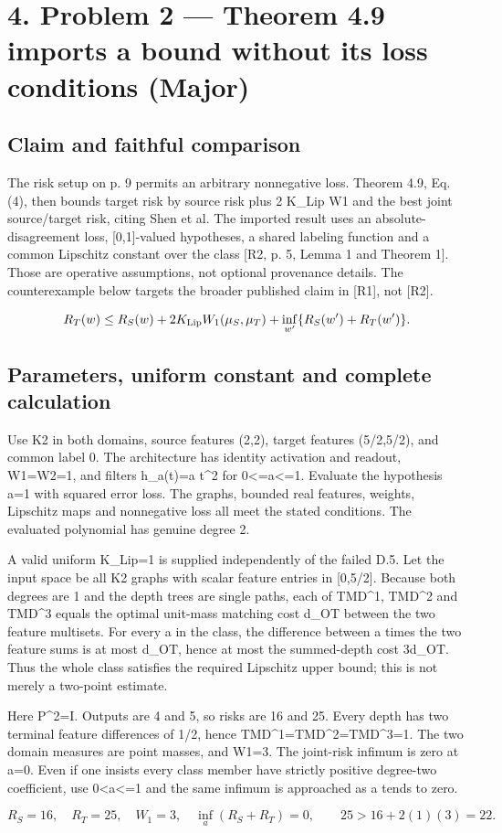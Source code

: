 \documentclass[10pt]{article}
\begin{document}
\section*{4. Problem 2 — Theorem 4.9 imports a bound without its loss conditions (Major)}
\subsection*{Claim and faithful comparison}
The risk setup on p. 9 permits an arbitrary nonnegative loss. Theorem 4.9, Eq. (4), then bounds target risk by source risk plus 2 K\_Lip W1 and the best joint source/target risk, citing Shen et al. The imported result uses an absolute-disagreement loss, [0,1]-valued hypotheses, a shared labeling function and a common Lipschitz constant over the class [R2, p. 5, Lemma 1 and Theorem 1]. Those are operative assumptions, not optional provenance details. The counterexample below targets the broader published claim in [R1], not [R2].\par
\[R_T(w)\le R_S(w)+2K_{\rm Lip}W_1(\mu_S,\mu_T)+\inf_{w'}\{R_S(w')+R_T(w')\}.\]\par
\subsection*{Parameters, uniform constant and complete calculation}
Use K2 in both domains, source features (2,2), target features (5/2,5/2), and common label 0. The architecture has identity activation and readout, W1=W2=1, and filters h\_a(t)=a t\textasciicircum{}2 for 0<=a<=1. Evaluate the hypothesis a=1 with squared error loss. The graphs, bounded real features, weights, Lipschitz maps and nonnegative loss all meet the stated conditions. The evaluated polynomial has genuine degree 2.\par
A valid uniform K\_Lip=1 is supplied independently of the failed D.5. Let the input space be all K2 graphs with scalar feature entries in [0,5/2]. Because both degrees are 1 and the depth trees are single paths, each of TMD\textasciicircum{}1, TMD\textasciicircum{}2 and TMD\textasciicircum{}3 equals the optimal unit-mass matching cost d\_OT between the two feature multisets. For every a in the class, the difference between a times the two feature sums is at most d\_OT, hence at most the summed-depth cost 3d\_OT. Thus the whole class satisfies the required Lipschitz upper bound; this is not merely a two-point estimate.\par
Here P\textasciicircum{}2=I. Outputs are 4 and 5, so risks are 16 and 25. Every depth has two terminal feature differences of 1/2, hence TMD\textasciicircum{}1=TMD\textasciicircum{}2=TMD\textasciicircum{}3=1. The two domain measures are point masses, and W1=3. The joint-risk infimum is zero at a=0. Even if one insists every class member have strictly positive degree-two coefficient, use 0<a<=1 and the same infimum is approached as a tends to zero.\par
\[R_S=16,\quad R_T=25,\quad W_1=3,\quad \inf_{a}(R_S+R_T)=0,\qquad 25>16+2(1)(3)=22.\]\par
\end{document}
